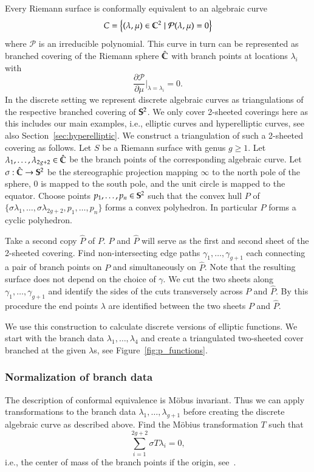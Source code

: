 \documentclass[Thesis.tex]{subfiles}
\begin{document}
Every Riemann surface is conformally equivalent to an algebraic curve
\[C=\left\{(\lambda,\mu)\in \C^2 \mid \mathcal P(\lambda,\mu)=0\right\}\]
where $\mathcal P$ is an irreducible polynomial.
This curve in turn can be represented as branched covering of the Riemann sphere $\hat{\C}$ with branch points at locations $\lambda_i$ with \[\frac{\partial\mathcal P}{\partial \mu}\Bigr|_{\lambda=\lambda_i} = 0.\]
In the discrete setting we represent discrete algebraic curves as triangulations of the respective branched covering of $\S^2$.
We only cover 2-sheeted coverings here as this includes our main examples, i.e., elliptic curves and hyperelliptic curves, see also Section~\ref{sec:hyperelliptic}.
We construct a triangulation of such a 2-sheeted covering as follows.
Let $S$ be a Riemann surface with genus $g\geq 1$.
Let $\lambda_1,\ldots,\lambda_{2g+2}\in \hat\C$ be the branch points of the corresponding algebraic curve.
Let $\sigma :\hat\C\to\S^2$ be the stereographic projection mapping $\infty$ to the north pole of the sphere, $0$ is mapped to the south pole, and the unit circle is mapped to the equator.
Choose points $p_1,\ldots,p_n\in\S^2$ such that the convex hull $P$ of $\{\sigma\lambda_1,\ldots,\sigma\lambda_{2g+2},p_1,\ldots,p_n\}$ forms a convex polyhedron.
In particular $P$ forms a cyclic polyhedron.

Take a second copy $\hat P$ of $P$. $P$ and $\hat P$ will serve as the first and second sheet of the 2-sheeted covering.
Find non-intersecting edge paths $\gamma_1,\ldots,\gamma_{g+1}$ each connecting a pair of branch points on $P$ and simultaneously on $\hat P$.
Note that the resulting surface does not depend on the choice of $\gamma$.
We cut the two sheets along $\gamma_1,\ldots,\gamma_{g+1}$ and identify the sides of the cuts transversely across $P$ and $\hat P$.
By this procedure the end points $\lambda$ are identified between the two sheets $P$ and $\hat P$.

We use this construction to calculate discrete versions of elliptic functions.
We start with the branch data $\lambda_1,\ldots,\lambda_{4}$ and create a triangulated two-sheeted cover branched at the given $\lambda$s, see Figure~\ref{fig:p_functions}.

\subsubsection{Normalization of branch data}
The description of conformal equivalence is M{\"o}bus invariant. Thus we can apply transformations to the branch data $\lambda_1,\ldots,\lambda_{g+1}$ before creating the discrete algebraic curve as described above. Find the M{\"o}bius transformation $T$ such that
\[\sum_{i=1}^{2g+2}\sigma T \lambda_i = 0,\]
i.e., the center of mass of the branch points if the origin, see~\cite{Springborn05}.
\end{document}
